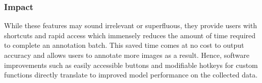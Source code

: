 \makeReconfigFigs

\subsubsection{Impact}
While these features may sound irrelevant or superfluous, they provide users with shortcuts and rapid access which immensely reduces the amount of time required to complete an annotation batch. This saved time comes at no cost to output accuracy and allows users to annotate more images as a result. Hence, software improvements such as easily accessible buttons and modifiable hotkeys for custom functions directly translate to improved model performance on the collected data.